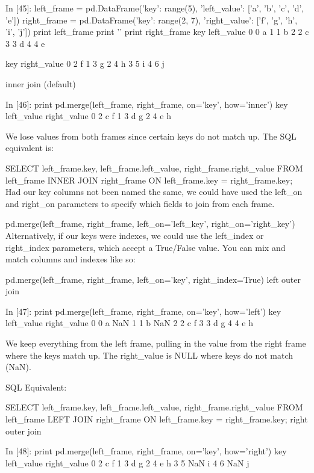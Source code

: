In [45]:
left_frame = pd.DataFrame({'key': range(5), 
                           'left_value': ['a', 'b', 'c', 'd', 'e']})
right_frame = pd.DataFrame({'key': range(2, 7), 
                           'right_value': ['f', 'g', 'h', 'i', 'j']})
print left_frame
print '\n'
print right_frame
   key left_value
0    0          a
1    1          b
2    2          c
3    3          d
4    4          e


   key right_value
0    2           f
1    3           g
2    4           h
3    5           i
4    6           j

inner join (default)

In [46]:
print pd.merge(left_frame, right_frame, on='key', how='inner')
   key left_value right_value
0    2          c           f
1    3          d           g
2    4          e           h

We lose values from both frames since certain keys do not match up. The SQL equivalent is:

    SELECT left_frame.key, left_frame.left_value, right_frame.right_value
    FROM left_frame
    INNER JOIN right_frame
        ON left_frame.key = right_frame.key;
Had our key columns not been named the same, we could have used the left_on and right_on parameters to specify which fields to join from each frame.

    pd.merge(left_frame, right_frame, left_on='left_key', right_on='right_key')
Alternatively, if our keys were indexes, we could use the left_index or right_index parameters, which accept a True/False value. You can mix and match columns and indexes like so:

    pd.merge(left_frame, right_frame, left_on='key', right_index=True)
left outer join

In [47]:
print pd.merge(left_frame, right_frame, on='key', how='left')
   key left_value right_value
0    0          a         NaN
1    1          b         NaN
2    2          c           f
3    3          d           g
4    4          e           h

We keep everything from the left frame, pulling in the value from the right frame where the keys match up. The right_value is NULL where keys do not match (NaN).

SQL Equivalent:

SELECT left_frame.key, left_frame.left_value, right_frame.right_value
FROM left_frame
LEFT JOIN right_frame
    ON left_frame.key = right_frame.key;
right outer join

In [48]:
print pd.merge(left_frame, right_frame, on='key', how='right')
   key left_value right_value
0    2          c           f
1    3          d           g
2    4          e           h
3    5        NaN           i
4    6        NaN           j


